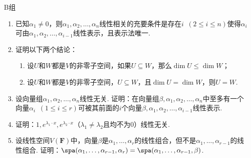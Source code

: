 \centerline{\heiti B组}
\begin{enumerate}
    \item 已知$\alpha_1\neq 0$，则$\alpha_1,\alpha_2,\ldots,\alpha_n$线性相关的充要条件是存在$i\enspace(2 \leqslant i \leqslant n)$使得$\alpha_i$可由$\alpha_1,\alpha_2,\ldots,\alpha_{i-1}$线性表示，且表示法唯一.

    \item 证明以下两个结论：
          \begin{enumerate}
              \item 设$U$和$W$都是$V$的非零子空间，如果$U\subseteq W$，那么$\dim U \leqslant \dim W$；

              \item 设$U$和$W$都是$V$的非零子空间，$U\subseteq W$，且$\dim U = \dim W$，则$U = W$.
          \end{enumerate}

    \item 设向量组$\alpha_1,\alpha_2,\ldots,\alpha_n$线性无关. 证明：在向量组$\beta,\alpha_1,\alpha_2,\ldots,\alpha_n$中至多有一个向量$\alpha_i\enspace(1 \leqslant i \leqslant r)$可被其前面的$i$个向量$\beta,\alpha_1,\alpha_2,\ldots,\alpha_{i-1}$线性表示.

    \item 证明：$1,e^{\lambda_1\cdot x},e^{\lambda_2\cdot x}$（$\lambda_1\neq\lambda_2$且均不为0）线性无关.

    \item 设线性空间$V(\mathbf{F})$中，向量$\beta$是$\alpha_1,\ldots,\alpha_r$的线性组合，但不是$\alpha_1,\ldots,\alpha_{r-1}$的线性组合. 证明：$\spa(\alpha_1,\ldots,\alpha_{r-1},\alpha_r)=\spa(\alpha_1,\ldots,\alpha_{r-1},\beta)$.
\end{enumerate}

